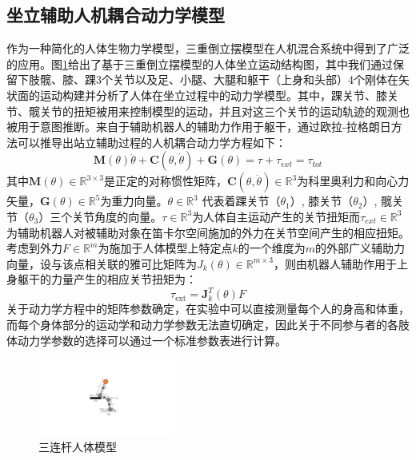 \subsection{坐立辅助人机耦合动力学模型}  
作为一种简化的人体生物力学模型，三重倒立摆模型在人机混合系统中得到了广泛的应用。图\ref{fig:4-1}给出了基于三重倒立摆模型的人体坐立运动结构图，其中我们通过保留下肢髋、膝、踝3个关节以及足、小腿、大腿和躯干（上身和头部）4个刚体在矢状面的运动构建并分析了人体在坐立过程中的动力学模型。其中，踝关节、膝关节、髋关节的扭矩被用来控制模型的运动，并且对这三个关节的运动轨迹的观测也被用于意图推断。来自于辅助机器人的辅助力作用于躯干，通过欧拉-拉格朗日方法可以推导出站立辅助过程的人机耦合动力学方程如下：
\begin{equation}
    \mathbf{M}(\theta) \ddot{\theta}+\mathbf{C}(\theta, \dot{\theta})+\mathbf{G}(\theta)=\tau+\tau_{ext}=\tau_{tot}
    \label{eq:4-1}
\end{equation}
其中$\mathbf{M}(\theta)\in \mathbb{R}^{3\times 3}$是正定的对称惯性矩阵，$\mathbf{C}(\theta, \dot{\theta})\in \mathbb{R}^3$为科里奥利力和向心力矢量，$\mathbf{G}(\theta)\in \mathbb{R}^5$为重力向量。$\theta \in \mathbb{R}^3$ 代表着踝关节（$\theta_1$）, 膝关节（$\theta_2$）, 髋关节（$\theta_3$）三个关节角度的向量。$\tau \in \mathbb{R}^3$为人体自主运动产生的关节扭矩而$\tau_{ext} \in \mathbb{R}^3$为辅助机器人对被辅助对象在笛卡尔空间施加的外力在关节空间产生的相应扭矩。考虑到外力$F\in \mathbb{R}^m$为施加于人体模型上特定点$k$的一个维度为$m$的外部广义辅助力向量，设与该点相关联的雅可比矩阵为$J_k(\theta)\in \mathbb{R}^{m\times 3}$，则由机器人辅助作用于上身躯干的力量产生的相应关节扭矩为：
\begin{equation}
    \tau_{\text {ext}}=\mathbf{J}_k^T(\theta) F
    \label{eq:4-2}
\end{equation}
关于动力学方程中的矩阵参数确定，在实验中可以直接测量每个人的身高和体重，而每个身体部分的运动学和动力学参数无法直切确定，因此关于不同参与者的各肢体动力学参数的选择可以通过一个标准参数表进行计算\cite{tozerenHumanBodyDynamics2000}。

\begin{figure}[htb]
    \centering\includegraphics[width=0.4\textwidth]{figures/4-Fig-1.pdf}
    \caption{三连杆人体模型}
    \label{fig:4-1}
\end{figure}
